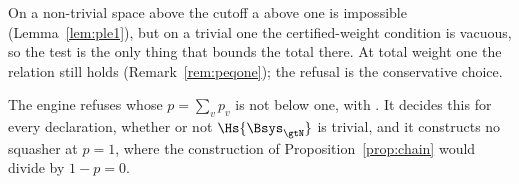 
On a non-trivial space above the cutoff a  above one is
impossible (Lemma~\ref{lem:ple1}), but on a trivial one the certified-weight
condition is vacuous, so the test is the only thing that bounds the total
there. At total weight one the relation still holds
(Remark~\ref{rem:peqone}); the refusal is the conservative choice.

\begin{requirement}
\label{req:total-weight-refusal}
The engine refuses  whose 
$p=\sum_vp_v$ is not below one, with . It
decides this for every declaration, whether or not $\Hs{\Bsys_{\gtN}}$ is
trivial, and it constructs no squasher at $p=1$, where the construction of
Proposition~\ref{prop:chain} would divide by $1-p=0$.
\end{requirement}
